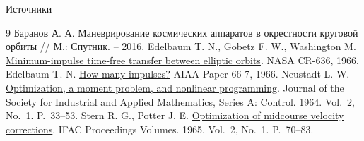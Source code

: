 \documentclass[11pt,aspectratio=169,t]{beamer}
\begin{document}
\begin{frame}{Источники}
\begin{thebibliography}{9}
Баранов А. А. Маневрирование космических аппаратов в окрестности круговой орбиты // М.: Спутник. – 2016.
Edelbaum T. N., Gobetz F. W., Washington M.
\href{https://ntrs.nasa.gov/citations/19660030604}{Minimum-impulse time-free transfer between elliptic orbits}.
NASA CR-636, 1966.
Edelbaum T. N.
\href{https://doi.org/10.2514/6.1966-7}{How many impulses?}
AIAA Paper 66-7, 1966.
Neustadt L. W.
\href{https://doi.org/10.1137/0302004}{Optimization, a moment problem, and nonlinear programming}.
Journal of the Society for Industrial and Applied Mathematics, Series A: Control.
1964. Vol.~2, No.~1. P.~33--53.
Stern R. G., Potter J. E.
\href{https://www.sciencedirect.com/science/article/abs/pii/S1474667017690700}{Optimization of midcourse velocity corrections}.
IFAC Proceedings Volumes. 1965. Vol.~2, No.~1. P.~70--83.
\end{thebibliography}
\end{frame}
\end{document}

